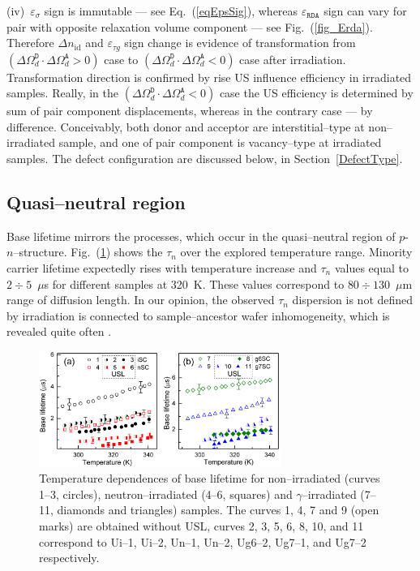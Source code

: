 \documentclass[aip,jap, amsmath,amssymb,reprint]{revtex4-1}
\begin{document}
\noindent
(iv)~$\varepsilon_{\sigma}$ sign is immutable --- see Eq.~(\ref{eqEpsSig}),
whereas $\varepsilon_{\mathtt{RDA}}$ sign can vary for pair with opposite relaxation volume component --- see Fig.~(\ref{fig_Erda}).
Therefore $\Delta n_{\mathrm{id}}$ and $\varepsilon_{\tau g}$ sign change is evidence of transformation
from $(\Delta\Omega_d^\mathtt{D}\cdot\Delta\Omega_d^\mathtt{A}>0)$  case to
$(\Delta\Omega_d^\mathtt{D}\cdot\Delta\Omega_d^\mathtt{A}<0)$ case after irradiation.
Transformation direction is confirmed by rise US influence efficiency in irradiated samples.
Really, in the $(\Delta\Omega_d^\mathtt{D}\cdot\Delta\Omega_d^\mathtt{A}<0)$ case the US efficiency is determined by sum of pair component displacements,
whereas in the contrary case  --- by difference.
Conceivably, both donor and acceptor are interstitial--type at non--irradiated sample, and one of pair component is vacancy--type at irradiated samples.
The defect configuration are discussed below, in Section~\ref{DefectType}.


\subsection{Quasi--neutral region\label{Base}}

Base lifetime mirrors the processes, which occur in the quasi--neutral region  of $p$-$n$--structure.
Fig.~(\ref{fig_TAUr}) shows the  $\tau_n$  over the explored temperature range.
Minority carrier lifetime expectedly rises with temperature increase and
$\tau_n$ values equal to $2\div5$~$\mu$s for different samples at 320~K.
These values correspond to $80\div130$~$\mu$m range of diffusion length.
In our opinion, the observed $\tau_n$ dispersion is not defined by irradiation is connected to sample--ancestor wafer inhomogeneity, which is revealed quite often \cite{Oxide:Chen,Oxide_Schon}.

\begin{figure}
\includegraphics[width=0.7\textwidth]{olikhFig6}%
\caption{\label{fig_TAUr}
Temperature dependences of base lifetime for non--irradiated (curves 1--3, circles),
neutron--irradiated (4--6, squares) and $\gamma$--irradiated (7--11, diamonds and triangles) samples.
The curves 1, 4, 7 and 9 (open marks) are obtained without USL,
curves 2, 3, 5, 6, 8, 10, and 11 correspond to
Ui--1, Ui--2, Un--1, Un--2, Ug6--2, Ug7--1, and Ug7--2 respectively.
}%
\end{figure}
\end{document}
